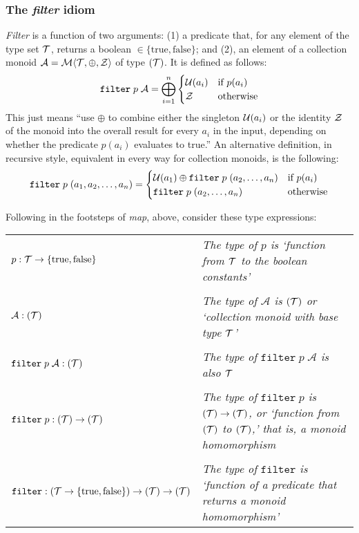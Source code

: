 \subsubsection{\color{red}The \emph{filter} idiom}


\emph{Filter} is a function of two arguments: (1) a predicate that, for any element of the type set $\mathcal{T}$, returns a boolean $\in\{\text{true},\text{false}\}$; and (2), an element of a collection monoid $\mathcal{A}=\mathcal{M}\langle{\mathcal{T}},{\oplus},{\mathcal{Z}}\rangle$ of type $(\mathcal{T})$. It is defined as follows:
  $$\mathtt{filter}\;p\;\mathcal{A}=\bigoplus^n_{i=1}
    \begin{cases}
       \mathcal{U}(a_i) & \text{if $p(a_i)$} \\ 
       \mathcal{Z} & \text{otherwise}
    \end{cases}$$
This just means ``use $\oplus$ to combine either the singleton $\mathcal{U}(a_i)$ or the identity $\mathcal{Z}$ of the monoid into the overall result for every $a_i$ in the input, depending on whether the predicate $p(a_i)$ evaluates to true.'' An alternative definition, in recursive style, equivalent in every way for collection monoids, is the following:
  $$\mathtt{filter}\;p\;(a_1,a_2,\ldots,a_n) =
  \begin{cases}
    \mathcal{U}(a_1)\oplus\mathtt{filter}\;p\;(a_2,\ldots,a_n) & \text{if $p(a_i)$} \\
    \mathtt{filter}\;p\;(a_2,\ldots,a_n) & \text{otherwise}
  \end{cases}$$

Following in the footsteps of \emph{map}, above, consider these type expressions:
\begin{center}
\begin{tabular}{ll}
  $p:\mathcal{T}\rightarrow\{\text{true},\text{false}\}$ 
    & \parbox{2.85in}
      {\footnotesize\emph{The type of $p$ is `function from 
      $\mathcal{T}$ to the boolean constants'}}\\
  {}&{}\\
  $\mathcal{A}:(\mathcal{T})$ 
    & \parbox{2.85in}
      {\footnotesize\emph{The type of $\mathcal{A}$ is $(\mathcal{T})$ or 
      `collection monoid with base type $\mathcal{T}$'}}\\
  {}&{}\\
  $\mathtt{filter}\;p\;\mathcal{A}:(\mathcal{T})$
    & \parbox{2.85in}
      {\footnotesize\emph{The type of $\mathtt{filter}\;p\;\mathcal{A}$ 
      is also $\mathcal{T}$}}\\
  {}&{}\\
  $\mathtt{filter}\;p:(\mathcal{T})\rightarrow(\mathcal{T})$
    & \parbox{2.85in}
      {\footnotesize\emph{The type of $\mathtt{filter}\;p$ is 
      $(\mathcal{T})\rightarrow(\mathcal{T})$, 
      or `function from $(\mathcal{T})$ to $(\mathcal{T})$,' that is, a monoid homomorphism}}\\
  {}&{}\\
  $\mathtt{filter}:(\mathcal{T}\rightarrow\{\text{true},\text{false}\})
    \rightarrow(\mathcal{T})\rightarrow(\mathcal{T})$
    & \parbox{2.85in}
      {\footnotesize\emph{The type of $\mathtt{filter}$ is `function 
      of a predicate that returns a monoid homomorphism'}}\\
\end{tabular}
\end{center}


